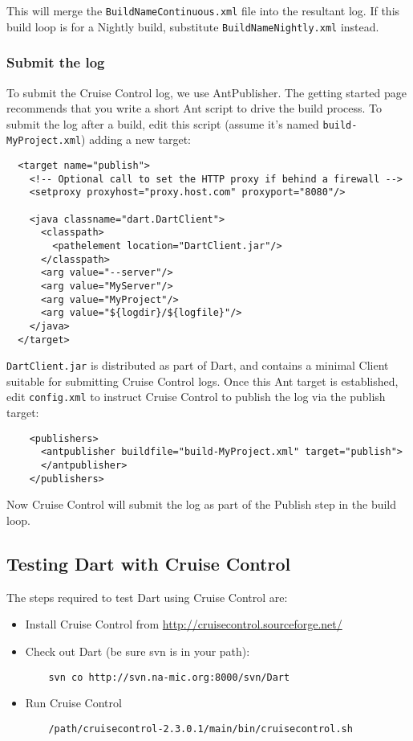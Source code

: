 \documentclass{InsightBook}
\newcommand{\filename}[1]{\texttt{#1}}
\begin{document}
This will merge the \filename{BuildNameContinuous.xml} file into the
resultant log.  If this build loop is for a Nightly build, substitute
\filename{BuildNameNightly.xml} instead.

\subsubsection{Submit the log}
To submit the Cruise Control log, we use AntPublisher.  The getting
started page recommends that you write a short Ant script to drive the
build process.  To submit the log after a build, edit this script
(assume it's named \filename{build-MyProject.xml}) adding a new target:
\begin{verbatim}
  <target name="publish">
    <!-- Optional call to set the HTTP proxy if behind a firewall -->
    <setproxy proxyhost="proxy.host.com" proxyport="8080"/>

    <java classname="dart.DartClient">
      <classpath>
        <pathelement location="DartClient.jar"/>
      </classpath>
      <arg value="--server"/>
      <arg value="MyServer"/>
      <arg value="MyProject"/>
      <arg value="${logdir}/${logfile}"/>
    </java>
  </target>
\end{verbatim}

\filename{DartClient.jar} is distributed as part of Dart, and contains a
minimal Client suitable for submitting Cruise Control logs.  Once this
Ant target is established, edit \filename{config.xml} to instruct Cruise
Control to publish the log via the publish target:
\begin{verbatim}
    <publishers> 
      <antpublisher buildfile="build-MyProject.xml" target="publish">
      </antpublisher>
    </publishers> 
\end{verbatim}

Now Cruise Control will submit the log as part of the Publish step in
the build loop.

\subsection{Testing Dart with Cruise Control}
The steps required to test Dart using Cruise Control are:

\begin{itemize}
  \item Install Cruise Control from \url{http://cruisecontrol.sourceforge.net/}
  \item Check out Dart (be sure svn is in your path):
  \begin{verbatim}
    svn co http://svn.na-mic.org:8000/svn/Dart
  \end{verbatim}
  \item Run Cruise Control
  \begin{verbatim}
    /path/cruisecontrol-2.3.0.1/main/bin/cruisecontrol.sh
  \end{verbatim}
\end{itemize}
\end{document}
